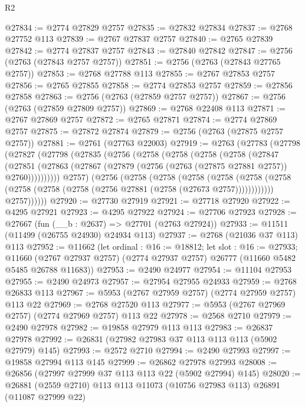 \begin{lexlean}{R2}
\begin{coremodule}
@27834 := @2774 @27829 @2757
@27835 := @27832 @27834
@27837 := @2768 @27752 @113
@27839 := @2767 @27837 @2757
@27840 := @2765 @27839
@27842 := @2774 @27837 @2757
@27843 := @27840 @27842
@27847 := @2756 (@2763 (@27843 @2757 @2757))
@27851 := @2756 (@2763 (@27843 @27765 @2757))
@27853 := @2768 @27788 @113
@27855 := @2767 @27853 @2757
@27856 := @2765 @27855
@27858 := @2774 @27853 @2757
@27859 := @27856 @27858
@27863 := @2756 (@2763 (@27859 @2757 @2757))
@27867 := @2756 (@2763 (@27859 @27809 @2757))
@27869 := @2768 @22408 @113
@27871 := @2767 @27869 @2757
@27872 := @2765 @27871
@27874 := @2774 @27869 @2757
@27875 := @27872 @27874
@27879 := @2756 (@2763 (@27875 @2757 @2757))
@27881 := @2761 (@27763 @22003)
@27919 := @2763
    (@27783
      (@27798
        (@27827
          (@27798
            (@27835
              (@2756
                (@2758
                  (@2758
                    (@2758
                      (@2758
                        (@27847
                          (@27851
                            (@27863
                              (@27867 (@27879 (@2756 (@2763 (@27875 @27881 @2757)) @2760))))))))))
                @2757)
              (@2756
                (@2758
                  (@2758
                    (@2758
                      (@2758
                        (@2758
                          (@2758 (@2758 (@2758 (@2758 (@2756 @27881 (@2758 (@27673 @2757))))))))))))
                @2757))))))
@27920 := @27730 @27919
@27921 := @27718 @27920
@27922 := @4295 @27921
@27923 := @4295 @27922
@27924 := @27706 @27923
@27928 := @27667 (fun (__b : @2637) => @27701 (@2763 @27924))
@27933 := @11511 (@11499 (@26755 @24930) @24934 @113)
@27937 := @2768 (@21036 @37 @113) @113
@27952 := @11662
    (let ordinal : @16 := @18812;
    let slot : @16 := @27933;
    @11660 (@2767 @27937 @2757) (@2774 @27937 @2757) @26777 (@11660 @5482 @5485 @26788 @11683))
@27953 := @2490 @24977
@27954 := @11104 @27953
@27955 := @2490 @24973
@27957 := @27954 @27955 @24933
@27959 := @2768 @26833 @113
@27967 := @5953 (@2767 @27959 @2757) (@2774 @27959 @2757) @113 @22
@27969 := @2768 @27520 @113
@27977 := @5953 (@2767 @27969 @2757) (@2774 @27969 @2757) @113 @22
@27978 := @2568 @2710
@27979 := @2490 @27978
@27982 := @19858 @27979 @113 @113
@27983 := @26837 @27978
@27992 := @26831 (@27982 @27983 @37 @113 @113 @113 (@5902 @27979) @145)
@27993 := @2572 @2710
@27994 := @2490 @27993
@27997 := @19858 @27994 @113 @145
@27999 := @26862 @27978 @27993
@28008 := @26856 (@27997 @27999 @37 @113 @113 @22 (@5902 @27994) @145)
@28020 := @26881 (@2559 @2710) @113 @113 @11073 (@10756 @27983 @113) @26891 (@11087 @27999 @22)

\end{coremodule}
\end{lexlean}
